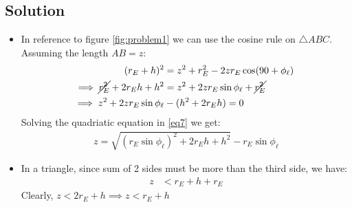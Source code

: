 \documentclass[titlepage]{article}
\begin{document}
\subsection{Solution}

\begin{itemize}
    \item In reference to figure \ref*{fig:problem1} we can use the cosine rule on $\triangle ABC$. Assuming the length $AB = z$:
          \begin{align}
              (r_E+h)^2                             & = z^2+r_E^2-2zr_E\cos(90+\phi_{\ell}) \ \nonumber       \\
              \implies \cancel{r_E^2} + 2r_Eh + h^2 & = z^2 + 2zr_E\sin\phi_{\ell} + \cancel{r_E^2} \nonumber \\
              \implies z^2 +2zr_E\sin\phi_{\ell}    & -(h^2+2r_Eh)     = 0 \label{eq7}
          \end{align}
          Solving the quadriatic equation in \ref{eq7} we get:
          \begin{align}
              \boxed{z = \sqrt{(r_E\sin \phi_{\ell})^2+2r_Eh+h^2}-r_E\sin\phi_{\ell}} \label{eq8}
          \end{align}
    \item In  a triangle, since sum of 2 sides must be more than the third side, we have:
          \begin{align}
              z & < r_E+h + r_E  \label{eq9}
          \end{align}
          Clearly, $z<2r_E+h \implies \boxed{z<r_E+h}$


\end{itemize}
\end{document}
